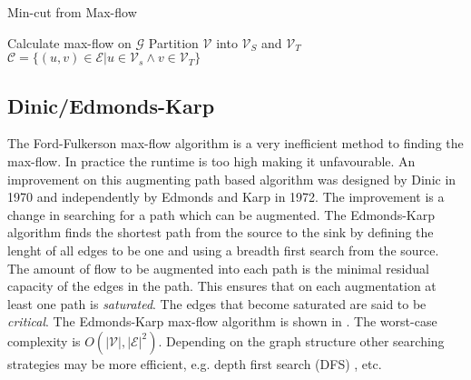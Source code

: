 \begin{algorithm}[!t]
	\caption{Min-cut from Max-flow}\label{alg:graphsegmentation}
	\begin{algorithmic}[1]
		\State Calculate max-flow on $\mathcal{G}$
		\State Partition $\mathcal{V}$ into $\mathcal{V}_S$ and $\mathcal{V}_T$
		\State $\mathcal{C} = \{ (u,v) \in \mathcal{E} | u \in \mathcal{V}_s \wedge v \in \mathcal{V}_T \}$
	\end{algorithmic}
\end{algorithm}


\subsection{Dinic/Edmonds-Karp}
\label{sec:Dinic}

The Ford-Fulkerson max-flow algorithm is a very inefficient method to finding the max-flow. In practice the runtime is too high making it unfavourable. An improvement on this augmenting path based algorithm was designed by Dinic\citep{Dinic1970} in 1970 and independently by Edmonds and Karp\citep{Edmonds1972} in 1972. The improvement is a change in searching for a path which can be augmented. The Edmonds-Karp algorithm finds the shortest path from the source to the sink by defining the lenght of all edges to be one and using a breadth first search from the source. The amount of flow to be augmented into each path is the minimal residual capacity of the edges in the path. This ensures that on each augmentation at least one path is \textit{saturated}. The edges that become saturated are said to be \textit{critical}. The Edmonds-Karp max-flow algorithm is shown in . The worst-case complexity is $O(|\mathcal{V}|,|\mathcal{E}|^2)$. Depending on the graph structure other searching strategies may be more efficient, e.g. depth first search (DFS) \citep{Cormen2009}, etc.

